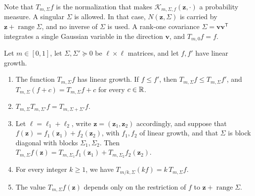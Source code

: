 Note that $T_{m,\Sigma}f$ is the normalization that makes
$\mathcal K_{m,\Sigma,f}(\mathbf z,\cdot)$ a probability measure. A singular
$\Sigma$ is allowed. In that case, $N(\mathbf z,\Sigma)$ is carried by $\mathbf
z+\operatorname{range}\Sigma$, and no inverse of $\Sigma$ is used. A rank-one
covariance $\Sigma=\mathbf v\mathbf v^{\mathsf T}$ integrates a single Gaussian
variable in the direction $\mathbf v$, and $T_{m,0}f=f$.

\begin{lemma}\label{lem:inp-steps}
Let $m\in[0,1]$, let $\Sigma,\Sigma'\succeq0$ be $\ell\times\ell$ matrices, and
let $f,f'$ have linear growth.
\begin{enumerate}[label=\textup{(\alph*)}]
\item The function $T_{m,\Sigma}f$ has linear growth. If $f\le f'$, then
 $T_{m,\Sigma}f\le T_{m,\Sigma}f'$, and $T_{m,\Sigma}(f+c)=T_{m,\Sigma}f+c$ for
 every $c\in\mathbb R$.
\item $T_{m,\Sigma}T_{m,\Sigma'}f=T_{m,\Sigma+\Sigma'}f$.
\item Let $\ell=\ell_1+\ell_2$, write $\mathbf z=(\mathbf z_1,\mathbf z_2)$
 accordingly, and suppose that $f(\mathbf z)=f_1(\mathbf z_1)+f_2(\mathbf z_2)$,
 with $f_1,f_2$ of linear growth,
 and that $\Sigma$ is block diagonal with blocks $\Sigma_1,\Sigma_2$. Then
 $T_{m,\Sigma}f(\mathbf z)=T_{m,\Sigma_1}f_1(\mathbf z_1)+T_{m,\Sigma_2}f_2(\mathbf z_2)$.
\item For every integer $k\ge1$, we have $T_{m/k,\Sigma}(kf)=k\,T_{m,\Sigma}f$.
\item The value $T_{m,\Sigma}f(\mathbf z)$ depends only on the restriction of
 $f$ to $\mathbf z+\operatorname{range}\Sigma$.
\end{enumerate}
\end{lemma}

